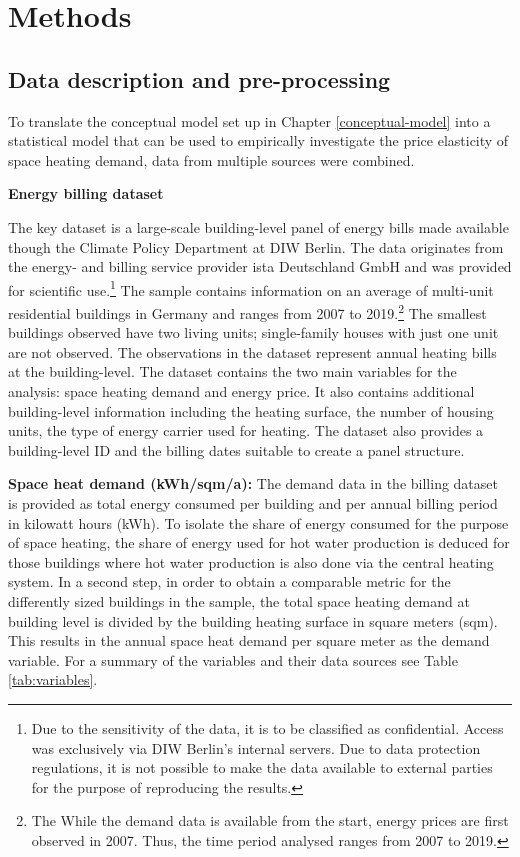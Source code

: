 \documentclass[12pt,twoside]{reedthesis}
\begin{document}
\hypertarget{methods}{%
\chapter{Methods}\label{methods}}

\hypertarget{data}{%
\section{Data description and pre-processing}\label{data}}

To translate the conceptual model set up in Chapter \ref{conceptual-model} into a statistical model that can be used to empirically investigate the price elasticity of space heating demand, data from multiple sources were combined.

\textbf{Energy billing dataset}

The key dataset is a large-scale building-level panel of energy bills made available though the Climate Policy Department at DIW Berlin. The data originates from the energy- and billing service provider ista Deutschland GmbH and was provided for scientific use.\footnote{Due to the sensitivity of the data, it is to be classified as confidential. Access was exclusively via DIW Berlin's internal servers. Due to data protection regulations, it is not possible to make the data available to external parties for the purpose of reproducing the results.} The sample contains information on an average of multi-unit residential buildings in Germany and ranges from 2007 to 2019.\footnote{The While the demand data is available from the start, energy prices are first observed in 2007. Thus, the time period analysed ranges from 2007 to 2019.} The smallest buildings observed have two living units; single-family houses with just one unit are not observed. The observations in the dataset represent annual heating bills at the building-level. The dataset contains the two main variables for the analysis: space heating demand and energy price. It also contains additional building-level information including the heating surface, the number of housing units, the type of energy carrier used for heating. The dataset also provides a building-level ID and the billing dates suitable to create a panel structure.

\textbf{Space heat demand (kWh/sqm/a):} The demand data in the billing dataset is provided as total energy consumed per building and per annual billing period in kilowatt hours (kWh). To isolate the share of energy consumed for the purpose of space heating, the share of energy used for hot water production is deduced for those buildings where hot water production is also done via the central heating system. In a second step, in order to obtain a comparable metric for the differently sized buildings in the sample, the total space heating demand at building level is divided by the building heating surface in square meters (sqm). This results in the annual space heat demand per square meter as the demand variable. For a summary of the variables and their data sources see Table \ref{tab:variables}.
\end{document}
